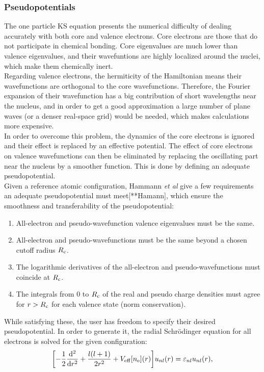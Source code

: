 \subsubsection*{Pseudopotentials}
The one particle KS equation presents the numerical difficulty of dealing accurately with both core and valence electrons. Core electrons are those that do not participate in chemical bonding. Core eigenvalues are much lower than valence eigenvalues, and their wavefuntions are highly localized around the nuclei, which make them chemically inert.\\

Regarding valence electrons, the hermiticity of the Hamiltonian means their wavefunctions are orthogonal to the core wavefunctions. Therefore, the Fourier expansion of their wavefunction has a big contribution of short wavelengths near the nucleus, and in order to get a good approximation a large number of plane waves (or a denser real-space grid) would be needed, which makes calculations more expensive.\\

In order to overcome this problem, the dynamics of the core electrons is ignored and their effect is replaced by an effective potential. The effect of core electrons on valence wavefunctions can then be eliminated by replacing the oscillating part near the nucleus by a smoother function. This is done by defining an adequate pseudopotential.\\

Given a reference atomic configuration, Hammann \textit{et al} give a few requirements an adequate pseudopotential must meet[**Hamann], which ensure the smoothness and transferability of the pseudopotential:
\begin{enumerate}
\item All-electron and pseudo-wavefunction valence eigenvalues must be the same.
\item All-electron and pseudo-wavefunctions must be the same beyond a chosen cutoff radius \(R_{\mathrm{c}}\).
\item The logarithmic derivatives of the all-electron and pseudo-wavefunctions must coincide at \(R_{\mathrm{c}}\).
\item The integrals from \(0\) to \(R_{\mathrm{c}}\) of the real and pseudo charge densities must agree for \(r > R_{\mathrm{c}}\) for each valence state (norm conservation).
\end{enumerate}

While satisfying these, the user has freedom to specify their desired pseudopotential. In order to generate it, the radial Schrödinger equation for all electrons is solved for the given configuration:
\begin{equation}
\label{radial-sch}
\qty[-\frac 1 2 \frac{\mathrm{d}{^2}}{\mathrm{d}{r^2}}+\frac{l(l+1)}{2r^2}+V_{\mathrm{eff}}[n_{\mathrm{e}}](r)]u_{nl}(r)=\varepsilon_{nl}u_{nl}(r),
\end{equation}

